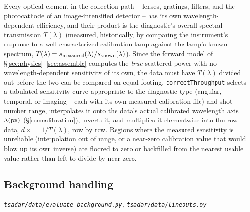 \documentclass[11pt]{article}
\newcommand{\code}[1]{\texttt{#1}}
\newcommand{\file}[1]{\texttt{#1}}
\begin{document}
Every optical element in the collection path -- lenses, gratings, filters, and the
photocathode of an image-intensified detector -- has its own wavelength-dependent
efficiency, and their product is the diagnostic's overall spectral transmission $T(\lambda)$
(measured, historically, by comparing the instrument's response to a well-characterized
calibration lamp against the lamp's known spectrum, $T(\lambda)=s_{\rm measured}(\lambda)/
s_{\rm known}(\lambda)$). Since the forward model of \S\ref{sec:physics}--\ref{sec:assemble}
computes the \emph{true} scattered power with no wavelength-dependent sensitivity of its
own, the data must have $T(\lambda)$ divided out before the two can be compared on equal
footing. \code{correctThroughput} selects a tabulated sensitivity curve appropriate to the
diagnostic type (angular, temporal, or imaging -- each with its own measured calibration
file) and shot-number range, interpolates it onto the data's actual calibrated wavelength
axis $\lambda(\rm px)$ (\S\ref{sec:calibration}), inverts it, and multiplies it elementwise
into the raw data, $d\mathrel{\times}=1/T(\lambda)$, row by row. Regions where the measured
sensitivity is unreliable (interpolation out of range, or a near-zero calibration value that
would blow up its own inverse) are floored to zero or backfilled from the nearest usable
value rather than left to divide-by-near-zero.

\subsection{Background handling}\label{sec:background}
\textit{\file{tsadar/data/evaluate\_background.py}, \file{tsadar/data/lineouts.py}}
\end{document}

